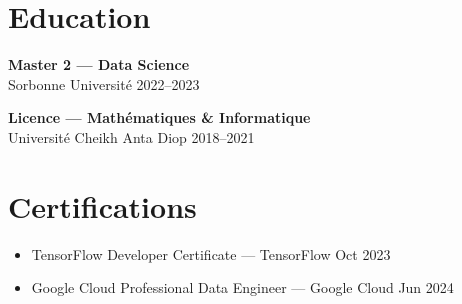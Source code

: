 \documentclass[10pt,letterpaper]{article}
\begin{document}
\begin{paracol}{2}
\begin{rightcolumn}
\vspace{0.5in}
\section*{Education}
\begin{tcolorbox}[colback=white,boxrule=1pt,colframe=primary]
\textbf{Master 2 — Data Science}\\
Sorbonne Université \hfill 2022–2023
\end{tcolorbox}

\begin{tcolorbox}[colback=white,boxrule=1pt,colframe=primary]
\textbf{Licence — Mathématiques \& Informatique}\\
Université Cheikh Anta Diop \hfill 2018–2021
\end{tcolorbox}

\section*{Certifications}
\begin{itemize}
  \item TensorFlow Developer Certificate — TensorFlow \hfill Oct 2023
  \item Google Cloud Professional Data Engineer — Google Cloud \hfill Jun 2024
\end{itemize}

\end{rightcolumn}
\end{paracol}
\end{document}
